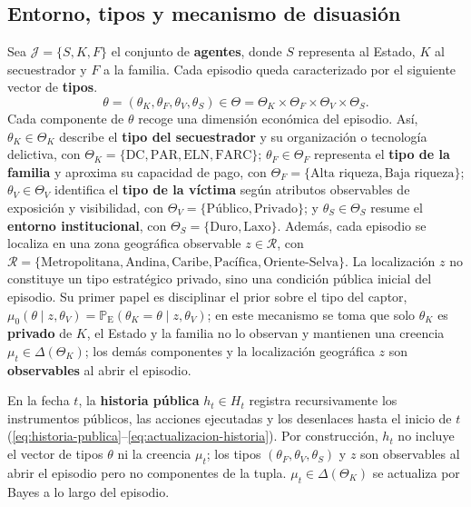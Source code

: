 \documentclass[12pt]{article}
\theoremstyle{definition}
\theoremstyle{remark}
\newcommand{\ProbE}{\mathbb{P}_{\mathrm{E}}}
\newcommand{\1}{\mathbf{1}}
\begin{document}
\subsection{Entorno, tipos y mecanismo de disuasión}
\label{subsec:acciones}

Sea $\mathcal{J}=\{S,K,F\}$ el conjunto de \textbf{agentes}, donde $S$ representa al Estado, $K$ al secuestrador y $F$ a la familia. Cada episodio queda caracterizado por el siguiente vector de \textbf{tipos}.
\[
\theta=(\theta_K,\theta_F,\theta_V,\theta_S)\in\Theta=\Theta_K\times\Theta_F\times\Theta_V\times\Theta_S.
\]
Cada componente de $\theta$ recoge una dimensión económica del episodio. Así, $\theta_K\in\Theta_K$ describe el \textbf{tipo del secuestrador} y su organización o tecnología delictiva, con $\Theta_K=\{\text{DC},\text{PAR},\text{ELN},\text{FARC}\}$; $\theta_F\in\Theta_F$ representa el \textbf{tipo de la familia} y aproxima su capacidad de pago, con $\Theta_F=\{\text{Alta riqueza},\text{Baja riqueza}\}$; $\theta_V\in\Theta_V$ identifica el \textbf{tipo de la víctima} según atributos observables de exposición y visibilidad, con $\Theta_V=\{\text{Público},\text{Privado}\}$; y $\theta_S\in\Theta_S$ resume el \textbf{entorno institucional}, con $\Theta_S=\{\text{Duro},\text{Laxo}\}$.
Además, cada episodio se localiza en una zona geográfica observable $z\in\mathcal{R}$, con $\mathcal{R}=\{\text{Metropolitana}, \text{Andina}, \text{Caribe}, \text{Pacífica}, \text{Oriente-Selva}\}$. La localización $z$ no constituye un tipo estratégico privado, sino una condición pública inicial del episodio. Su primer papel es disciplinar el prior sobre el tipo del captor, $\mu_0(\theta \mid z, \theta_V) = \ProbE(\theta_K = \theta \mid z, \theta_V)$; en este mecanismo se toma que solo $\theta_K$ es \textbf{privado} de $K$, el Estado y la familia no lo observan y mantienen una creencia $\mu_t\in\Delta(\Theta_K)$; los demás componentes y la localización geográfica $z$ son \textbf{observables} al abrir el episodio.


En la fecha $t$, la \textbf{historia pública} $h_t\in H_t$ registra recursivamente los instrumentos públicos, las acciones ejecutadas y los desenlaces hasta el inicio de $t$ \textup{(}\eqref{eq:historia-publica}--\eqref{eq:actualizacion-historia}\textup{)}. Por construcción, $h_t$ no incluye el vector de tipos $\theta$ ni la creencia $\mu_t$; los tipos $(\theta_F,\theta_V,\theta_S)$ y $z$ son observables al abrir el episodio pero no componentes de la tupla. $\mu_t\in\Delta(\Theta_K)$ se actualiza por Bayes a lo largo del episodio.
\end{document}
